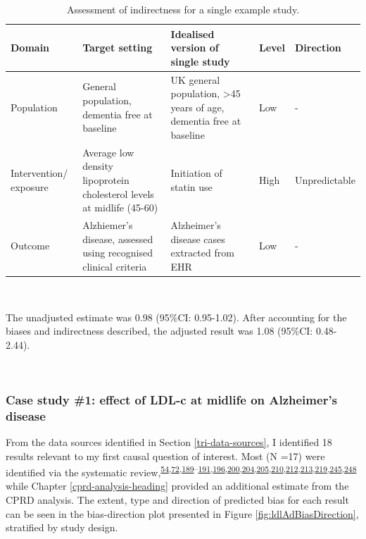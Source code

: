 \documentclass[a4paper, twoside]{templates/ociamthesis}
\begin{document}
\begin{table}[H]

\caption[singleIndirect]{\label{tab:singleIndirect-table}Assessment of indirectness for a single example study.}
\centering
\begin{tabular}[t]{>{\raggedright\arraybackslash}p{5em}>{\centering\arraybackslash}p{9em}>{\centering\arraybackslash}p{9em}>{\centering\arraybackslash}p{5em}>{\centering\arraybackslash}p{6em}}
\toprule
\textbf{Domain} & \textbf{Target setting} & \textbf{Idealised version of single study} & \textbf{Level} & \textbf{Direction}\\
\midrule
Population & General population, dementia free at baseline & UK general population, >45 years of age, dementia free at baseline & Low & -\\
\midrule
Intervention/ exposure & Average low density lipoprotein cholesterol levels at midlife (45-60) & Initiation of statin use & High & Unpredictable\\
\midrule
Outcome & Alzhiemer's disease, assessed using recognised clinical criteria & Alzheimer's disease cases extracted from EHR & Low & -\\
\bottomrule
\end{tabular}
\end{table}

~

The unadjusted estimate was 0.98 (95\%CI: 0.95-1.02). After accounting for the biases and indirectness described, the adjusted result was 1.08 (95\%CI: 0.48-2.44).

~

\hypertarget{case-study-1-effect-of-ldl-c-at-midlife-on-alzheimers-disease}{%
\subsubsection{Case study \#1: effect of LDL-c at midlife on Alzheimer's disease}\label{case-study-1-effect-of-ldl-c-at-midlife-on-alzheimers-disease}}

From the data sources identified in Section \ref{tri-data-sources}, I identified 18 results relevant to my first causal question of interest. Most (N =17) were identified via the systematic review,\textsuperscript{\protect\hyperlink{ref-schilling2017}{54},\protect\hyperlink{ref-ostergaard2015}{72},\protect\hyperlink{ref-ancelin2012}{189}--\protect\hyperlink{ref-bettermann2012}{191},\protect\hyperlink{ref-chou2014}{196},\protect\hyperlink{ref-haag2009}{200},\protect\hyperlink{ref-li2004}{204},\protect\hyperlink{ref-li2010}{205},\protect\hyperlink{ref-rea2005}{210},\protect\hyperlink{ref-reitz2010}{212},\protect\hyperlink{ref-smeeth2009}{213},\protect\hyperlink{ref-zandi2005}{219},\protect\hyperlink{ref-tynkkynen2018}{245},\protect\hyperlink{ref-yoshitake1995}{248}} while Chapter \ref{cprd-analysis-heading} provided an additional estimate from the CPRD analysis. The extent, type and direction of predicted bias for each result can be seen in the bias-direction plot presented in Figure \ref{fig:ldlAdBiasDirection}, stratified by study design.
\end{document}
